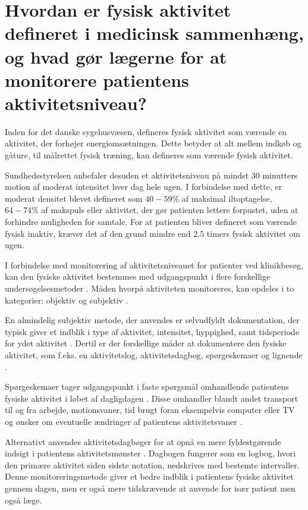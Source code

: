 \section{Hvordan er fysisk aktivitet defineret i medicinsk sammenhæng, og hvad gør lægerne for at monitorere patientens aktivitetsniveau?}

Inden for det danske sygehusvæsen, defineres fysisk aktivitet som værende en aktivitet, der forhøjer energiomsætningen. 
Dette betyder at alt mellem indkøb og gåture, til målrettet fysisk træning, kan defineres som værende fysisk aktivitet.\citep{gupta2013, terkelsen2015}

Sundhedsstyrelsen anbefaler desuden et aktivitetsniveau på mindst 30 minutters motion af moderat intensitet hver dag hele ugen. 
I forbindelse med dette, er moderat densitet blevet defineret som $40-59\%$ af maksimal iltoptagelse, $64-74\%$ af makspuls eller aktivitet, der gør patienten lettere forpustet, uden at forhindre muligheden for samtale. 
For at patienten bliver defineret som værende fysisk inaktiv, kræver det af den grund mindre end $2.5$ timers fysisk aktivitet om ugen.\citep{gupta2013}

I forbindelse med monitorering af aktivitetsniveauet for patienter ved klinikbesøg, kan den fysiske aktivitet bestemmes med udgangspunkt i flere forskellige undersøgelsesmetoder \citep{gupta2013}. 
Måden hvorpå aktiviteten monitoreres, kan opdeles i to kategorier: objektiv og subjektiv \citep{gupta2013, adamo2009}. 

En almindelig subjektiv metode, der anvendes er selvudfyldt dokumentation, der typisk giver et indblik i type af aktivitet, intensitet, hyppighed, samt tidsperiode for ydet aktivitet \citep{adamo2009}. Dertil er der forskellige måder at dokumentere den fysiske aktivitet, som f.eks. en aktivitetslog, aktivitetsdagbog, spørgeskemaer og lignende \citep{adamo2009}. 

Spørgeskemaer tager udgangspunkt i faste spørgsmål omhandlende patientens fysiske aktivitet i løbet af dagligdagen \citep{muller2009}. 
Disse omhandler blandt andet transport til og fra arbejde, motionsvaner, tid brugt foran eksempelvis computer eller TV og ønsker om eventuelle ændringer af patientens aktivitetsvaner \citep{gupta2013, vestergaard2012}. 

Alternativt anvendes aktivitetsdagbøger \citep{muller2009} for at opnå en mere fyldestgørende indsigt i patientens aktivitetsmønster \citep{gupta2013}. 
Dagbogen fungerer som en logbog, hvori den primære aktivitet siden sidste notation, nedskrives med bestemte intervaller. 
Denne monitoreringsmetode giver et bedre indblik i patientens fysiske aktivitet gennem dagen, men er også mere tidskrævende at anvende for især patient men også læge.\citep{gupta2013}



